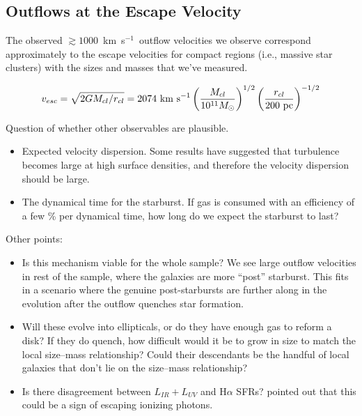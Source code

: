 \documentclass[apj]{emulateapj}
\newcommand{\kms}{km~s$^{-1}$}
\begin{document}
\subsection{Outflows at the Escape Velocity}

The observed $\gtrsim1000$~\kms\ outflow velocities we observe correspond
approximately to the escape velocities for compact regions (i.e.,
massive star clusters) with the sizes and masses that we've measured.

\begin{equation}
v_{esc} = \sqrt{2GM_{cl}/r_{cl}} = 2074~\textnormal{km~s}^{-1} \\%
\left({M_{cl}\over10^{11} M_{\odot}}\right)^{1/2} 
\left({r_{cl}\over200~\textnormal{pc}}\right)^{-1/2}
\label{eq:vesc}
\end{equation}


Question of whether other observables are plausible.  
\begin{itemize}
\item Expected velocity dispersion.  Some results have suggested that
  turbulence becomes large at high surface densities, and therefore
  the velocity dispersion should be large.  
\item The dynamical time for the starburst.  If gas is consumed with
  an efficiency of a few \% per dynamical time, how long do we expect
  the starburst to last?
\end{itemize}

Other points: 
\begin{itemize}
\item Is this mechanism viable for the whole sample?  We see large
  outflow velocities in rest of the sample, where the galaxies are
  more ``post'' starburst.  This fits in a scenario where the genuine
  post-starbursts are further along in the evolution after the outflow
  quenches star formation.
\item Will these evolve into ellipticals, or do they have enough gas
  to reform a disk?  If they do quench, how difficult would it be to
  grow in size to match the local size--mass relationship?  Could
  their descendants be the handful of local galaxies that don't lie on
  the size--mass relationship?
\item Is there disagreement between $L_{IR}+L_{UV}$ and H$\alpha$
  SFRs?  \citet{hec11} pointed out that this could be a sign of
  escaping ionizing photons.
\end{itemize}
\end{document}
